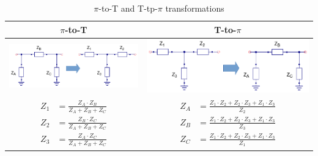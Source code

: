 \begin{table}[H]
  \centering
  \begin{tabular}{ | c | c | }
    \hline
    $\pi$-to-T & T-to-$\pi$\\ \hline
    \begin{minipage}{.4\textwidth}
      \includegraphics[width=\linewidth]{./images/Synthesis/Impedance_Matching/Pi-to-tee-transformation}
    \end{minipage}
    &
    \begin{minipage}{.4\textwidth}
      \includegraphics[width=\linewidth]{./images/Synthesis/Impedance_Matching/Tee-to-pi-transformation}
    \end{minipage}
    \\ \hline
    \begin{minipage}{.4\textwidth}
         {\begin{align}
           Z_1 &= \frac{Z_A \cdot Z_B}{Z_A + Z_B + Z_C}\\
           Z_2 &= \frac{Z_B \cdot Z_C}{Z_A + Z_B + Z_C}\\
           Z_3 &= \frac{Z_A \cdot Z_C}{Z_A + Z_B + Z_C}
         \end{align}}
    \end{minipage}
    &
        \begin{minipage}{.4\textwidth}
         {\begin{align}
           Z_A &= \frac{Z_1 \cdot Z_2 + Z_2 \cdot Z_3 + Z_1 \cdot Z_3}{Z_2}\\
           Z_B &= \frac{Z_1 \cdot Z_2 + Z_2 \cdot Z_3 + Z_1 \cdot Z_3}{Z_3}\\
           Z_C &= \frac{Z_1 \cdot Z_2 + Z_2 \cdot Z_3 + Z_1 \cdot Z_3}{Z_1}
         \end{align}}
    \end{minipage}
    \\ \hline
  \end{tabular}
  \caption{$\pi$-to-T and T-tp-$\pi$ transformations \cite{ElectricalCommunicationAAlbert}}
  \label{tbl:pi-to-tee-transformation}
\end{table}

